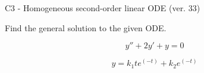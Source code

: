 \begin{exercise}
  \begin{exerciseTitle}C3 - Homogeneous second-order linear ODE (ver. 33)\end{exerciseTitle}
  \begin{exerciseStatement}
    
Find the general solution to the given ODE.

    
\[y''+2y'+y = 0\]

  \end{exerciseStatement}
  \begin{exerciseAnswer}
    
\[y= k_{1} t e^{\left(-t\right)} + k_{2} e^{\left(-t\right)}\]

  \end{exerciseAnswer}
\end{exercise}